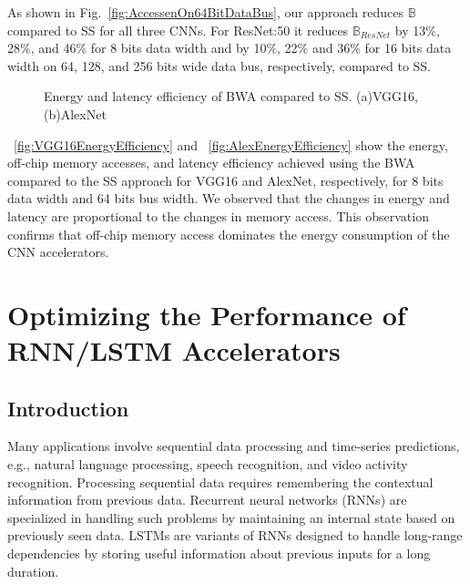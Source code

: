 \documentclass[a4paper,10pt]{article}
\newcommand{\numBytesOffChip}{\mathbb{B}}
\begin{document}
As shown in Fig.~\ref{fig:AccessenOn64BitDataBus}, our approach reduces $\numBytesOffChip$ compared to SS for all three CNNs. For ResNet:50 it reduces $\numBytesOffChip_{ResNet}$ by 13\%, 28\%, and 46\% for 8 bits data width and by 10\%, 22\% and 36\% for 16 bits data width on 64, 128, and 256 bits wide data bus, respectively, compared to SS.
\begin{figure}[!htb]
	\centering
    \captionsetup{font=sf}	
	\hfil
	\hfil
	\caption{Energy and latency efficiency of BWA compared to SS. (a)VGG16, (b)AlexNet}
	\label{fig:EffectOnLatency}
\end{figure}

\figurename{~\ref{fig:VGG16EnergyEfficiency}} and \figurename{~\ref{fig:AlexEnergyEfficiency}} show the energy, off-chip memory accesses, and latency efficiency achieved using the BWA compared to the SS approach for VGG16 and AlexNet, respectively, for 8 bits data width and 64 bits bus width. We observed that the changes in energy and latency are proportional to the changes in memory access. This observation confirms that off-chip memory access dominates the energy consumption of the CNN accelerators.
\section{Optimizing the Performance of RNN/LSTM Accelerators}
\subsection{Introduction}
Many applications involve sequential data processing and time-series predictions, e.g., natural language processing, speech recognition, and video activity recognition. Processing sequential data requires remembering the contextual information from previous data. Recurrent neural networks (RNNs) are specialized in handling such problems by maintaining an internal state based on previously seen data. LSTMs \cite{hochreiter1997long} are variants of RNNs designed to handle long-range dependencies by storing useful information about previous inputs for a long duration. 
\end{document}
